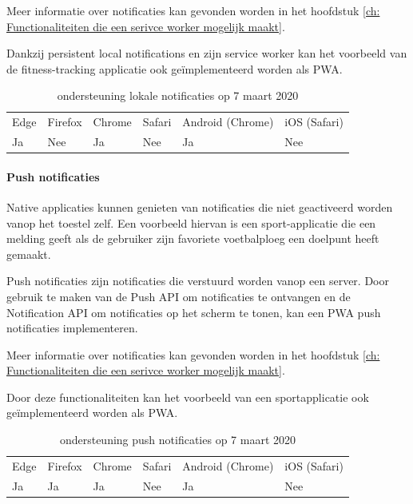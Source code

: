	Meer informatie over notificaties kan gevonden worden in het hoofdstuk \ref{ch: Functionaliteiten die een serivce worker mogelijk maakt}.
	
	Dankzij persistent local notifications en zijn service worker kan het voorbeeld van de fitness-tracking applicatie ook geïmplementeerd worden als PWA.
	
	\begin{table}[H]
		\centering
		\begin{tabular}{llllll}
			Edge & Firefox & Chrome & Safari & Android (Chrome) & iOS (Safari) \\
			Ja   & Nee      &  Ja     & Nee     & Ja               & Nee          
		\end{tabular}	
		\caption{ondersteuning lokale notificaties op 7 maart 2020}
	\end{table}
	
	\paragraph{Push notificaties}
	
	Native applicaties kunnen genieten van notificaties die niet geactiveerd worden vanop het toestel zelf. Een voorbeeld hiervan is een sport-applicatie die een melding geeft als de gebruiker zijn favoriete voetbalploeg een doelpunt heeft gemaakt.
	
	Push notificaties zijn notificaties die verstuurd worden vanop een server. Door gebruik te maken van de Push API \autocite{Sullivan2020} om notificaties te ontvangen en de Notification API om notificaties op het scherm te tonen, kan een PWA push notificaties implementeren. 
	
	Meer informatie over notificaties kan gevonden worden in het hoofdstuk \ref{ch: Functionaliteiten die een serivce worker mogelijk maakt}.
	
	Door deze functionaliteiten kan het voorbeeld van een sportapplicatie ook geïmplementeerd worden als PWA.
	
	\begin{table}[H]
		\centering
		\begin{tabular}{llllll}
			Edge & Firefox & Chrome & Safari & Android (Chrome) & iOS (Safari) \\
			Ja   & Ja      &  Ja     & Nee     & Ja               & Nee          
		\end{tabular}	
		\caption{ondersteuning push notificaties op 7 maart 2020}
	\end{table}
	

